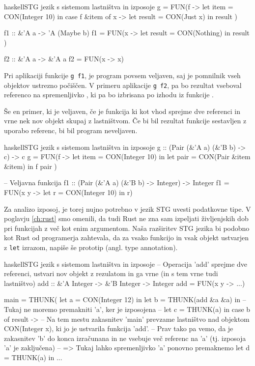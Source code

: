 \begin{code-box}{haskell}{STG jezik s sistemom lastništva in izposoje}
g = FUN(f ->
    let item = CON(Integer 10) in
    case f &item of {
        x ->
            let result = CON(Just x) in
                result
    }
)

f1 :: &'A a -> 'A (Maybe b)
f1 = FUN(x ->
    let result = CON(Nothing) in
        result
)

f2 :: &'A a -> &'A a
f2 = FUN(x -> x)
\end{code-box}

Pri aplikaciji funkcije \texttt{g f1}, je program povsem veljaven, saj je pomnilnik vseh objektov ustrezno počiščen. V primeru  aplikacije \texttt{g f2}, pa  bo rezultat vseboval referenco na spremenljivko , ki pa bo izbrisana po izhodu iz funkcije .

Še en primer, ki je veljaven, če je  funkcija ki kot vhod sprejme dve referenci in vrne nek nov objekt skupaj z lastništvom. Če bi bil rezultat funkcije  sestavljen z uporabo referenc, bi bil program neveljaven.

\begin{code-box}{haskell}{STG jezik s sistemom lastništva in izposoje}
g :: (Pair (&'A a) (&'B b) -> c) -> c
g = FUN(f ->
    let item = CON(Integer 10) in
    let pair = CON(Pair &item &item) in
        f pair
)

-- Veljavna funkcija
f1 :: (Pair (&'A a) (&'B b) -> Integer) -> Integer
f1 = FUN(x y -> let r = CON(Integer 10) in r)
\end{code-box}

Za analizo izposoj, je torej nujno potrebno v jezik STG uvesti podatkovne tipe. V poglavju \ref{ch:rust} smo omenili, da tudi Rust ne zna sam izpeljati življenjskih dob pri funkcijah z več kot enim argumentom. Naša razširitev STG jezika bi podobno kot Rust od programerja zahtevala, da za vsako funkcijo in vsak objekt ustvarjen z \texttt{let} izrazom, napiše še prototip (angl. type annotation).

\begin{code-box}{haskell}{STG jezik s sistemom lastništva in izposoje}
-- Operacija 'add' sprejme dve referenci, ustvari nov objekt z rezulatom in ga vrne (in s tem vrne tudi lastništvo)
add :: &'A Integer -> &'B Integer -> Integer
add = FUN(x y -> ...)

main = THUNK(
    let a = CON(Integer 12) in
    let b = THUNK(add &a &a) in
    -- Tukaj ne moremo premakniti 'a', ker je izposojena
    -- let c = THUNK(a) in
    case b of {
        result ->
            -- Na tem mestu zakasnitev 'main' prevzame lastništvo nad objektom CON(Integer x), ki jo je ustvarila funkcija 'add'.
            -- Prav tako pa vemo, da je zakasnitev 'b' do konca izračunana in ne vsebuje več referenc na 'a' (tj. izposoja 'a' je zaključena)
            -- => Tukaj lahko spremenljivko 'a' ponovno premaknemo
            let d = THUNK(a) in
                ...
    }
\end{code-box}

